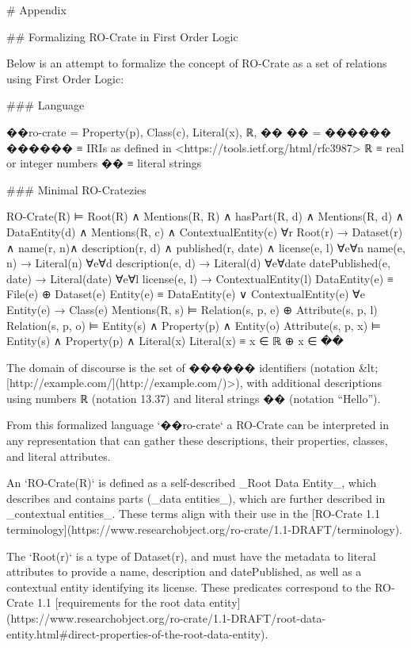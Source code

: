 # Appendix


## Formalizing RO-Crate in First Order Logic

Below is an attempt to formalize the concept of RO-Crate as a set of relations using First Order Logic:


### Language

    ��ro-crate = { Property(p), Class(c), Literal(x), ℝ, �� }
    �� =  ������
    ������ ≡  { IRIs as defined in <https://tools.ietf.org/html/rfc3987> }
    ℝ ≡  { real or integer numbers }
    �� ≡  { literal strings }

### Minimal RO-Cratezies

    RO-Crate(R) ⊨  Root(R) ∧ Mentions(R, R) ∧
        hasPart(R, d) ∧ Mentions(R, d) ∧ DataEntity(d) ∧
        Mentions(R, c) ∧ ContextualEntity(c)
    ∀r Root(r) →  Dataset(r) ∧ name(r, n)∧ description(r, d)
                            ∧ published(r, date) ∧ license(e, l)
    ∀e∀n name(e, n) →  Literal(n)
    ∀e∀d description(e, d) →  Literal(d)
    ∀e∀date datePublished(e, date) →  Literal(date)
    ∀e∀l license(e, l) →  ContextualEntity(l)
    DataEntity(e) ≡  File(e) ⊕ Dataset(e)
    Entity(e) ≡  DataEntity(e) ∨ ContextualEntity(e)
    ∀e Entity(e) → Class(e)
    Mentions(R, s) ⊨  Relation(s, p, e)  ⊕  Attribute(s, p, l)
    Relation(s, p, o) ⊨ Entity(s) ∧ Property(p) ∧ Entity(o)
    Attribute(s, p, x) ⊨ Entity(s)  ∧ Property(p) ∧ Literal(x)
    Literal(x) ≡  x ∈ ℝ  ⊕   x ∈ ��


The domain of discourse is the set of ������ identifiers (notation &lt;[http://example.com/](http://example.com/)>), with additional descriptions using numbers ℝ (notation 13.37) and literal strings �� (notation “Hello”). 

From this formalized language `��ro-crate` a RO-Crate can be interpreted in any representation that can gather these descriptions, their properties, classes, and literal attributes.  

An `RO-Crate(R)` is defined as a self-described _Root Data Entity_, which describes and contains parts (_data entities_), which are further described in _contextual entities_.  These terms align with their use in the [RO-Crate 1.1 terminology](https://www.researchobject.org/ro-crate/1.1-DRAFT/terminology). 

The `Root(r)` is a type of Dataset(r), and must have the metadata to literal attributes to provide a name, description and datePublished, as well as a contextual entity identifying its license. These predicates correspond to the RO-Crate 1.1 [requirements for the root data entity](https://www.researchobject.org/ro-crate/1.1-DRAFT/root-data-entity.html#direct-properties-of-the-root-data-entity).


